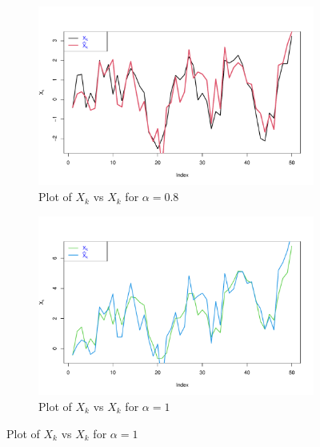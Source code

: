 \documentclass[a4paper, 11pt]{article}
\begin{document}
{\begin{enumerate}[label=(\alph*)]
\begin{figure}[hbt!]
	\begin{subfigure}{.475\linewidth}
		\includegraphics[width=\linewidth]{./ass5.2b-0.8.pdf}
		\caption{Plot of $X_k$ vs $\hat{X}_k$ for $\alpha=0.8$}
		\label{MLEDdet}
	\end{subfigure}\hfill %
	\begin{subfigure}{.475\linewidth}
		\includegraphics[width=\linewidth]{./ass5.2b-1.pdf}
		\caption{Plot of $X_k$ vs $\hat{X}_k$ for $\alpha=1$}
		\label{energydetPSK}
	\end{subfigure}
	

\end{figure}
\end{enumerate}}
\end{document}
